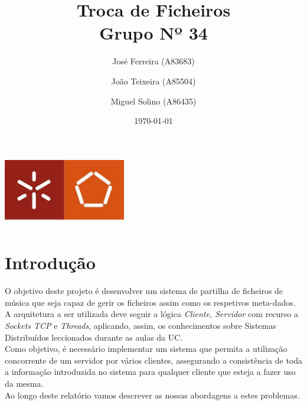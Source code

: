 \documentclass[a4paper]{report}
\begin{document}
\title{Troca de Ficheiros\\ 
\large Grupo Nº 34}
\author{José Ferreira (A83683) \and João Teixeira (A85504) \and Miguel Solino
(A86435)}
\date{\today}

\begin{center}
    \begin{minipage}{0.75\linewidth}
        \centering
        \includegraphics[width=0.4\textwidth]{eng.jpeg}\par\vspace{1cm}
        \vspace{1.5cm}
        \href{https://www.uminho.pt/PT}
        {\color{black}{\scshape\LARGE Universidade do Minho}} \par
        \vspace{1cm}
        \href{https://www.di.uminho.pt/}
        {\color{black}{\scshape\Large Departamento de Informática}} \par
        \vspace{1.5cm}
        \maketitle
    \end{minipage}
\end{center}

\tableofcontents

\pagebreak
\chapter{Introdução}
O objetivo deste projeto é desenvolver um sistema de partilha de ficheiros de 
música que seja capaz de gerir os ficheiros assim como os respetivos
meta-dados.\\
A arquitetura a ser utilizada deve seguir a lógica \textit{Cliente, Servidor}
com recurso a \textit{Sockets TCP} e \textit{Threads}, aplicando, assim, os
conhecimentos sobre Sistemas Distribuídos leccionados durante as aulas da UC.\\
Como objetivo, é necessário implementar um sistema que permita a utilização 
concorrente de um servidor por vários clientes, assegurando a consistência
de toda a informação introduzida no sistema para qualquer cliente que esteja
a fazer uso da mesma.\\
Ao longo deste relatório vamos descrever as nossas abordagens a estes problemas.
\end{document}
